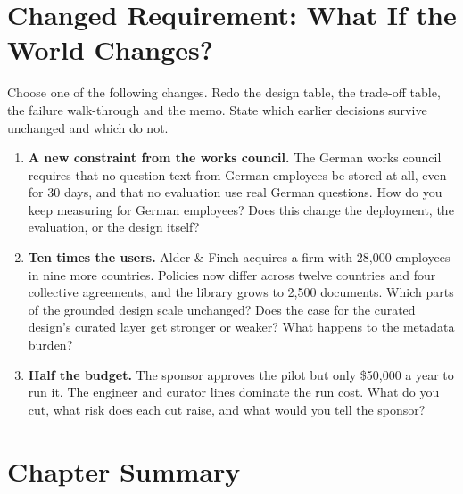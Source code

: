 \section{Changed Requirement: What If the World Changes?}
\label{sec:policy-changed}

Choose one of the following changes. Redo the design table, the trade-off table, the failure walk-through and the memo. State which earlier decisions survive unchanged and which do not.

\begin{enumerate}[itemsep=3pt]
  \item \textbf{A new constraint from the works council.} The German works council requires that no question text from German employees be stored at all, even for 30 days, and that no evaluation use real German questions. How do you keep measuring  for German employees? Does this change the deployment, the evaluation, or the design itself?
  \item \textbf{Ten times the users.} Alder \& Finch acquires a firm with 28{,}000 employees in nine more countries. Policies now differ across twelve countries and four collective agreements, and the library grows to 2{,}500 documents. Which parts of the grounded design scale unchanged? Does the case for the curated design's curated layer get stronger or weaker? What happens to the metadata burden?
  \item \textbf{Half the budget.} The sponsor approves the pilot but only \$50{,}000 a year to run it. The engineer and curator lines dominate the run cost. What do you cut, what risk does each cut raise, and what would you tell the sponsor?
\end{enumerate}

\section*{Chapter Summary}


